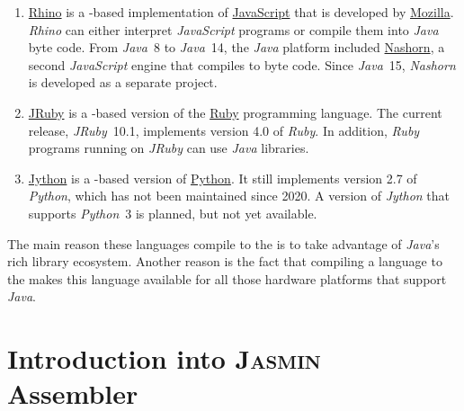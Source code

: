 \begin{enumerate}
      As of November 2026, \textsl{Clojure} occupies the $50^{\mathrm{th}}$ place in the
      \href{https://www.tiobe.com/tiobe-index/}{Tiobe index}.
\item \href{https://github.com/mozilla/rhino}{Rhino}
      is a -based implementation of
      \href{https://developer.mozilla.org/en-US/docs/Web/JavaScript}{JavaScript} that is developed by
      \href{https://www.mozilla.org}{Mozilla}.  \textsl{Rhino} can either interpret \textsl{JavaScript}
      programs or compile them into \textsl{Java} byte code.  From \textsl{Java}~8 to \textsl{Java}~14, the
      \textsl{Java} platform included \href{https://github.com/openjdk/nashorn}{Nashorn}, a second
      \textsl{JavaScript} engine that compiles to byte code.  Since \textsl{Java}~15, \textsl{Nashorn} is
      developed as a separate project.
\item \href{https://www.jruby.org}{JRuby}
      is a -based version of the \href{https://www.ruby-lang.org}{Ruby} programming language.
      The current release, \textsl{JRuby}~10.1, implements version 4.0 of \textsl{Ruby}.  In addition,
      \textsl{Ruby} programs running on \textsl{JRuby} can use \textsl{Java} libraries.
\item \href{https://www.jython.org}{Jython} 
      is a -based version of \href{https://www.python.org}{Python}.  It still implements
      version 2.7 of \textsl{Python}, which has not been maintained since 2020.  A version of \textsl{Jython}
      that supports \textsl{Python}~3 is planned, but not yet available.
\end{enumerate}
The main reason these languages compile to the  is to take advantage of \textsl{Java}'s rich library ecosystem.
Another reason is the fact that compiling a language to the  makes this language available for all those
hardware platforms that support \textsl{Java}.

\section{Introduction into \textsc{Jasmin} Assembler}

